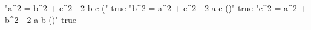 "a^2 = b^2 + c^2 - 2 ⁢b c \cos(\alpha" true
"b^2 = a^2 + c^2 - 2 a c \cos(\beta)" true
"c^2 = a^2 + b^2 - 2 a b \cos(\gamma)" true
